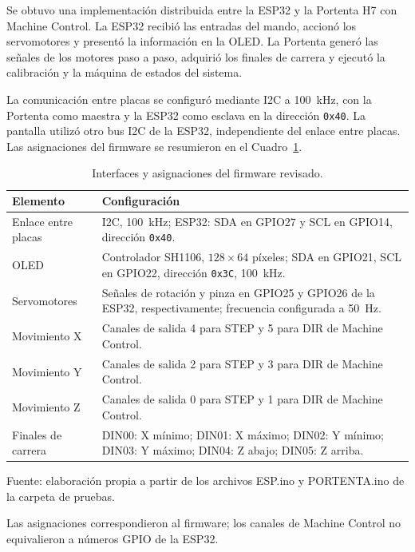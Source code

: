 Se obtuvo una implementación distribuida entre la ESP32 y la Portenta H7 con Machine Control. La ESP32 recibió las entradas del mando, accionó los servomotores y presentó la información en la OLED. La Portenta generó las señales de los motores paso a paso, adquirió los finales de carrera y ejecutó la calibración y la máquina de estados del sistema.

La comunicación entre placas se configuró mediante I2C a 100~kHz, con la Portenta como maestra y la ESP32 como esclava en la dirección \texttt{0x40}. La pantalla utilizó otro bus I2C de la ESP32, independiente del enlace entre placas. Las asignaciones del firmware se resumieron en el Cuadro~\ref{tab:fase4_interfaces}.

\begin{table}[H]
    \centering
    \caption{Interfaces y asignaciones del firmware revisado.}
    \label{tab:fase4_interfaces}
    \begin{tabular}{p{}p{}}
        \hline
        Elemento & Configuración \\
        \hline
        Enlace entre placas & I2C, 100~kHz; ESP32: SDA en GPIO27 y SCL en GPIO14, dirección \texttt{0x40}. \\
        OLED & Controlador SH1106, $128\times64$ píxeles; SDA en GPIO21, SCL en GPIO22, dirección \texttt{0x3C}, 100~kHz. \\
        Servomotores & Señales de rotación y pinza en GPIO25 y GPIO26 de la ESP32, respectivamente; frecuencia configurada a 50~Hz. \\
        Movimiento X & Canales de salida 4 para STEP y 5 para DIR de Machine Control. \\
        Movimiento Y & Canales de salida 2 para STEP y 3 para DIR de Machine Control. \\
        Movimiento Z & Canales de salida 0 para STEP y 1 para DIR de Machine Control. \\
        Finales de carrera & DIN00: X mínimo; DIN01: X máximo; DIN02: Y mínimo; DIN03: Y máximo; DIN04: Z abajo; DIN05: Z arriba. \\
        \hline
    \end{tabular}
    \par\small\raggedright Fuente: elaboración propia a partir de los archivos ESP.ino y PORTENTA.ino de la carpeta de pruebas.
    \par\small Las asignaciones correspondieron al firmware; los canales de Machine Control no equivalieron a números GPIO de la ESP32.
\end{table}

